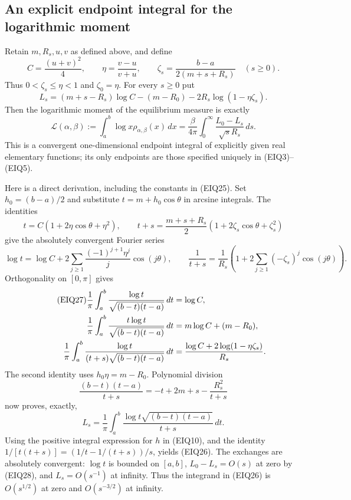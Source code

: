 \subsection{An explicit endpoint integral for the logarithmic moment}
Retain $m,R_s,u,v$ as defined above, and define
\begin{equation}\tag{EIQ24}
 C=\frac{(u+v)^2}4,\qquad
 \eta=\frac{v-u}{v+u},\qquad
 \zeta_s=\frac{b-a}{2(m+s+R_s)}\quad(s\geq0).
\end{equation}
Thus $0<\zeta_s\leq\eta<1$ and $\zeta_0=\eta$.
For every $s\geq0$ put
\begin{equation}\tag{EIQ25}
 L_s=(m+s-R_s)\log C-(m-R_0)
                  -2R_s\log(1-\eta\zeta_s).
\end{equation}
Then the logarithmic moment of the equilibrium measure is exactly
\begin{equation}\tag{EIQ26}
 \mathcal L(\alpha,\beta):=\int_a^b\log x\rho_{\alpha,\beta}(x)\,dx
 =\frac\beta{4\pi}\int_0^\infty
                    \frac{L_0-L_s}{\sqrt s R_s}\,ds.
\end{equation}
This is a convergent one-dimensional endpoint integral of explicitly
given real elementary functions; its only endpoints are those specified
uniquely in (EIQ3)--(EIQ5).

Here is a direct derivation, including the constants in (EIQ25).
Set $h_0=(b-a)/2$ and substitute $t=m+h_0\cos\theta$ in arcsine
integrals.  The identities
\[
 t=C(1+2\eta\cos\theta+\eta^2),\qquad
 t+s=\frac{m+s+R_s}2
                (1+2\zeta_s\cos\theta+\zeta_s^2)
\]
give the absolutely convergent Fourier series
\[
 \log t=\log C+
       2\sum_{j\geq1}\frac{(-1)^{j+1}\eta^j}j\cos(j\theta),
 \qquad
 \frac1{t+s}=\frac1{R_s}
       \left(1+2\sum_{j\geq1}(-\zeta_s)^j\cos(j\theta)\right).
\]
Orthogonality on $[0,\pi]$ gives
\begin{align}\tag{EIQ27}
 \frac1\pi\int_a^b\frac{\log t}{\sqrt{(b-t)(t-a)}}\,dt
 &=\log C,\\
 \frac1\pi\int_a^b\frac{t\log t}{\sqrt{(b-t)(t-a)}}\,dt
 &=m\log C+(m-R_0),\notag\\
 \frac1\pi\int_a^b\frac{\log t}{(t+s)\sqrt{(b-t)(t-a)}}\,dt
 &=\frac{\log C+2\log(1-\eta\zeta_s)}{R_s}.\notag
\end{align}
The second identity uses $h_0\eta=m-R_0$.
Polynomial division
\[
 \frac{(b-t)(t-a)}{t+s}
       =-t+2m+s-\frac{R_s^2}{t+s}
\]
now proves, exactly,
\begin{equation}\tag{EIQ28}
 L_s=\frac1\pi\int_a^b
               \frac{\log t\sqrt{(b-t)(t-a)}}{t+s}\,dt.
\end{equation}
Using the positive integral expression for $h$ in (EIQ10), and the
identity $1/[t(t+s)]=(1/t-1/(t+s))/s$, yields (EIQ26).
The exchanges are absolutely convergent: $\log t$ is bounded on
$[a,b]$, $L_0-L_s=O(s)$ at zero by (EIQ28), and $L_s=O(s^{-1})$
at infinity.  Thus the integrand in (EIQ26) is $O(s^{1/2})$ at zero
and $O(s^{-3/2})$ at infinity.

